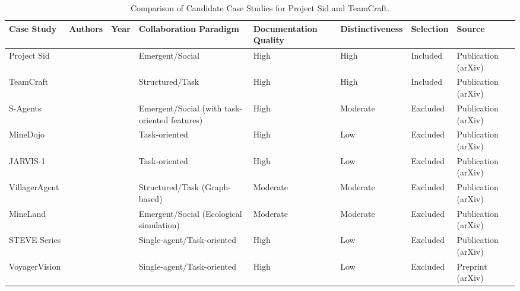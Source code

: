 \documentclass[a4paper, 12pt]{article}
\begin{document}
\begin{table}[ht]
    \caption{Comparison of Candidate Case Studies for Project Sid and TeamCraft.}
    \begin{tabular}{@{}lllp{3cm}p{3cm}lp{3cm}l@{}}
        \toprule
        \textbf{Case Study} & \textbf{Authors} & \textbf{Year} & \textbf{Collaboration Paradigm} & \textbf{Documentation Quality} & \textbf{Distinctiveness} & \textbf{Selection} & \textbf{Source} \\
        \midrule
        Project Sid & \citeauthor{al2024projectsidmanyagentsimulations} & \citeyear{al2024projectsidmanyagentsimulations} & Emergent/Social & High & High & Included & Publication (arXiv) \\
        TeamCraft & \citeauthor{long2024teamcraftbenchmarkmultimodalmultiagent} & \citeyear{long2024teamcraftbenchmarkmultimodalmultiagent} & Structured/Task & High & High & Included & Publication (arXiv) \\
        S-Agents & \citeauthor{chen2024sagentsselforganizingagentsopenended} & \citeyear{chen2024sagentsselforganizingagentsopenended} & Emergent/Social (with task-oriented features) & High & Moderate & Excluded & Publication (arXiv) \\
        MineDojo & \citeauthor{fan2022minedojobuildingopenendedembodied} & \citeyear{fan2022minedojobuildingopenendedembodied} & Task-oriented & High & Low & Excluded & Publication (arXiv) \\
        JARVIS-1 & \citeauthor{wang2023jarvis1openworldmultitaskagents} & \citeyear{wang2023jarvis1openworldmultitaskagents} & Task-oriented & High & Low & Excluded & Publication (arXiv) \\
        VillagerAgent & \citeauthor{dong2024villageragentgraphbasedmultiagentframework} & \citeyear{dong2024villageragentgraphbasedmultiagentframework} & Structured/Task (Graph-based) & Moderate & Moderate & Excluded & Publication (arXiv) \\
        MineLand & \citeauthor{yu2024minelandsimulatinglargescalemultiagent} & \citeyear{yu2024minelandsimulatinglargescalemultiagent} & Emergent/Social (Ecological simulation) & Moderate & Moderate & Excluded & Publication (arXiv) \\
        STEVE Series & \citeauthor{zhao2024steveseriesstepbystepconstruction} & \citeyear{zhao2024steveseriesstepbystepconstruction} & Single-agent/Task-oriented & High & Low & Excluded & Publication (arXiv) \\
        VoyagerVision & \citeauthor{smyth2025voyagervisioninvestigatingrolemultimodal} & \citeyear{smyth2025voyagervisioninvestigatingrolemultimodal} & Single-agent/Task-oriented & High & Low & Excluded & Preprint (arXiv) \\

\end{tabular}
\end{table}
\end{document}
